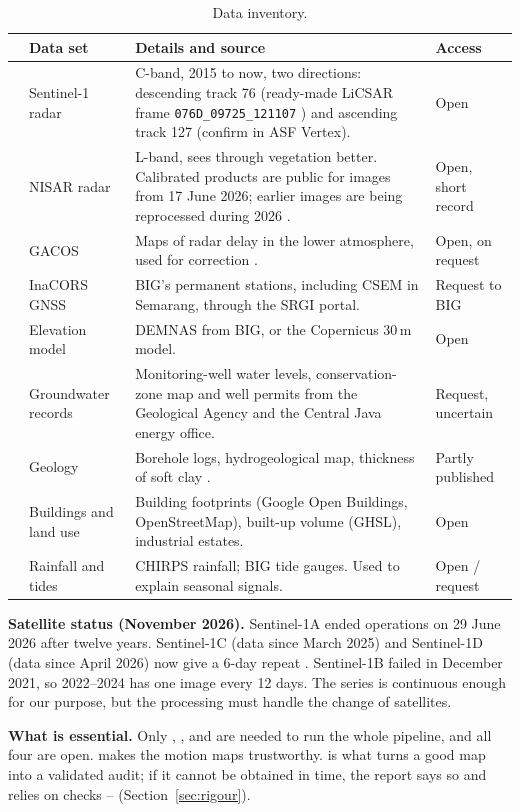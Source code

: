 {\small
\begin{xltabular}{\linewidth}{@{}L{9mm}L{33mm}Y L{27mm}@{}}
\caption{Data inventory.}\label{tab:data}\\*
\toprule
 & \textbf{Data set} & \textbf{Details and source} & \textbf{Access}\\*
\midrule
{} & Sentinel-1 radar & C-band, 2015 to now, two directions: descending track 76 (ready-made LiCSAR frame
  \texttt{076D\_09725\_121107} \cite{lo2022}) and ascending track 127 (confirm in ASF Vertex). & Open\\
 & NISAR radar & L-band, sees through vegetation better. Calibrated products are public for images
  from 17 June 2026; earlier images are being reprocessed during 2026 \cite{nisar2026}. & Open, short record\\
 & GACOS & Maps of radar delay in the lower atmosphere, used for correction \cite{yu2018}. & Open, on request\\
 & InaCORS GNSS & BIG's permanent stations, including CSEM in Semarang, through the SRGI portal. & Request to BIG\\
 & Elevation model & DEMNAS from BIG, or the Copernicus 30\,m model. & Open\\
 & Groundwater records & Monitoring-well water levels, conservation-zone map and well permits from the
  Geological Agency and the Central Java energy office. & Request, uncertain\\
 & Geology & Borehole logs, hydrogeological map, thickness of soft clay \cite{putranto2016}. & Partly published\\
 & Buildings and land use & Building footprints (Google Open Buildings, OpenStreetMap), built-up volume
  (GHSL), industrial estates. & Open\\
 & Rainfall and tides & CHIRPS rainfall; BIG tide gauges. Used to explain seasonal signals. & Open / request\\
\bottomrule
\end{xltabular}}

\textbf{Satellite status (November 2026).} Sentinel-1A ended operations on 29 June 2026 after twelve
years. Sentinel-1C (data since March 2025) and Sentinel-1D (data since April 2026) now give a 6-day
repeat \cite{s1status}. Sentinel-1B failed in December 2021, so 2022--2024 has one image every
12 days. The series is continuous enough for our purpose, but the processing must handle the change
of satellites.

\textbf{What is essential.} Only , ,  and  are needed to run the whole pipeline, and
all four are open.  makes the motion maps trustworthy.  is what turns a good map into a
validated audit; if it cannot be obtained in time, the report says so and relies on checks
-- (Section~\ref{sec:rigour}).
